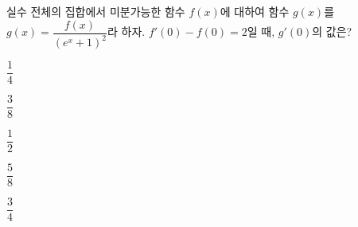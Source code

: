 실수 전체의 집합에서 미분가능한 함수 $f(x)$에 대하여 함수 $g(x)$를 $g(x)=\dfrac{f(x)}{(e^x+1)^2}$라 하자. $f'(0)-f(0)=2$일 때, $g'(0)$의 값은?
\begin{choices32}{\rule[-3ex]{0pt}{8ex}$\dfrac{1}{4}$}{\rule[-3ex]{0pt}{8ex}$\dfrac{3}{8}$}{\rule[-3ex]{0pt}{8ex}$\dfrac{1}{2}$}{\rule[-3ex]{0pt}{8ex}$\dfrac{5}{8}$}{\rule[-3ex]{0pt}{8ex}$\dfrac{3}{4}$}\end{choices32}
